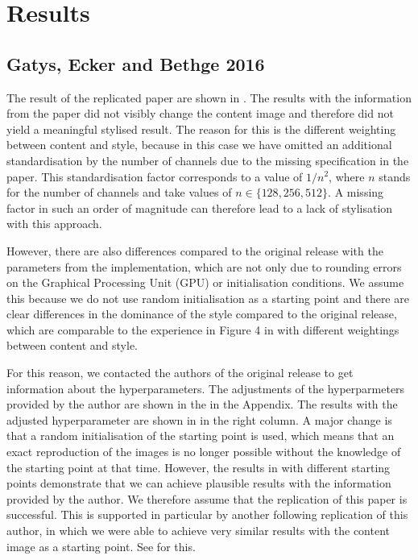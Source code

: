 \section{Results}

\subsection{Gatys, Ecker and Bethge 2016} \label{sec:Gatys1results}

The result of the replicated paper \cite{GEB2016} are shown in . The results with the information from the paper did not visibly change the content image and therefore did not yield a meaningful stylised result. The reason for this is the different weighting between content and style, because in this case we have omitted an additional standardisation by the number of channels due to the missing specification in the paper. This standardisation factor corresponds to a value of $1/n^2$, where $n$ stands for the number of channels and take values of $n \in \{128, 256, 512\}$. A missing factor in such an order of magnitude can therefore lead to a lack of stylisation with this approach.

However, there are also differences compared to the original release with the parameters from the implementation, which are not only due to rounding errors on the Graphical Processing Unit (GPU) or initialisation conditions. We assume this because we do not use random initialisation as a starting point and there are clear differences in the dominance of the style compared to the original release, which are comparable to the experience in Figure 4 in \cite{GEB2016} with different weightings between content and style.

For this reason, we contacted the authors of the original release to get information about the hyperparameters. The adjustments of the hyperparmeters provided by the author are shown in the  in the Appendix. The results with the adjusted hyperparameter are shown in  in the right column. A major change is that a random initialisation of the starting point is used, which means that an exact reproduction of the images is no longer possible without the knowledge of the starting point at that time. However, the results in  with different starting points demonstrate that we can achieve plausible results with the information provided by the author. We therefore assume that the replication of this paper is successful. This is supported in particular by another following replication of this author, in which we were able to achieve very similar results with the content image as a starting point. See  for this.

